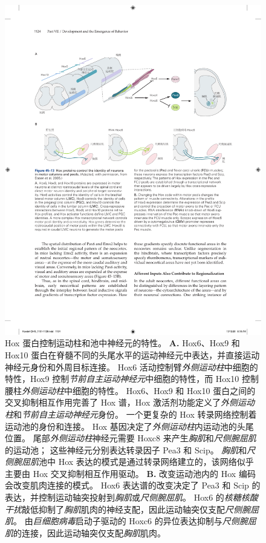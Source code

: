 \begin{figure}[htbp]
	\centering
	\includegraphics[width=1.0\linewidth]{chap45/fig_45_13}
	\caption{Hox 蛋白控制运动柱和池中神经元的特性\cite{dasen2005hox}。
		\textbf{A.} Hox6、Hox9 和 Hox10 蛋白在脊髓不同的头尾水平的运动神经元中表达，并直接运动神经元身份和外周目标连接。
		Hox6 活动控制臂\textit{外侧运动柱}中细胞的特性，Hox9 控制\textit{节前自主运动神经元}中细胞的特性，而 Hox10 控制腰柱\textit{外侧运动柱}中细胞的特性。
		Hox6、Hox9 和 Hox10 蛋白之间的交叉抑制相互作用完善了 Hox 谱，Hox 激活剂功能定义了\textit{外侧运动柱}和\textit{节前自主运动神经元}身份。
		一个更复杂的 Hox 转录网络控制着运动池的身份和连接。
		Hox 基因决定了\textit{外侧运动柱}内运动池的头尾位置。
		尾部\textit{外侧运动柱}神经元需要 Hoxc8 来产生\textit{胸肌}和\textit{尺侧腕屈肌}的运动池；
		这些神经元分别表达转录因子 Pea3 和 Scip。
		\textit{胸肌}和\textit{尺侧腕屈肌}池中 Hox 表达的模式是通过转录网络建立的，该网络似乎主要由 Hox 交叉抑制相互作用驱动。
		\textbf{B.} 改变运动池内的 Hox 编码会改变肌肉连接的模式。
		Hox6 表达谱的改变决定了 Pea3 和 Scip 的表达，并控制运动轴突投射到\textit{胸肌}或\textit{尺侧腕屈肌}。
		Hox6 的\textit{核糖核酸干扰}敲低抑制了\textit{胸肌}肌肉的神经支配，因此运动轴突仅支配\textit{尺侧腕屈肌}。
		由\textit{巨细胞病毒}启动子驱动的 Hoxc6 的异位表达抑制与\textit{尺侧腕屈肌}的连接，因此运动轴突仅支配\textit{胸肌}肌肉。}
	\label{fig:45_13}
\end{figure}




